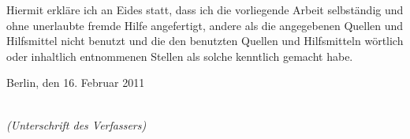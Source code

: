 \newpage
\thispagestyle{empty}

\begin{large}

\vspace*{2cm}

\noindent
Hiermit erkläre ich an Eides statt, dass ich die vorliegende Arbeit selbständig
und ohne unerlaubte fremde Hilfe angefertigt, andere als die
angegebenen Quellen und Hilfsmittel nicht benutzt und die den benutzten
Quellen und Hilfsmitteln wörtlich oder inhaltlich entnommenen Stellen als
solche kenntlich gemacht habe.

\vspace{2cm}

\noindent
Berlin, den 16. Februar 2011

\vspace{3cm}

\hspace*{7cm}%
\dotfill\\
\hspace*{8.5cm}%
\textit{(Unterschrift des Verfassers)}

\end{large}
